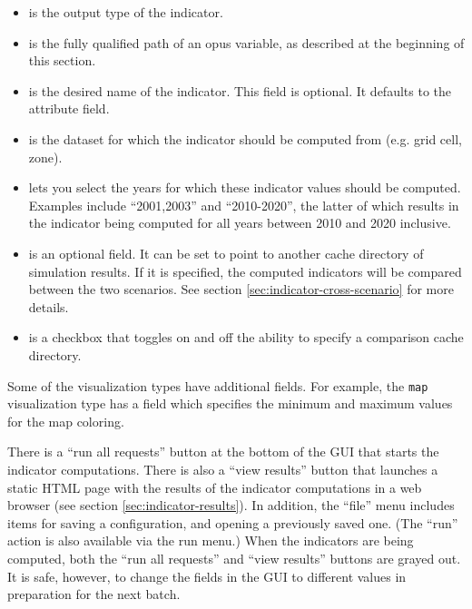 \begin{itemize}
\tight
\item {} is the output type of the indicator.

\item {} is the fully qualified path of an opus variable, as 
described at the beginning of this section. 

\item {} is the desired name of the indicator. This field is optional.
It defaults to the attribute field.

\item {} is the dataset for which the indicator should be 
computed from (e.g. grid cell, zone).

\item {} lets you select the years for
which these indicator values should be computed. Examples include
``2001,2003'' and ``2010-2020'', the latter of which results in 
the indicator being computed for all years between 2010 and 2020
inclusive. 

\item {} is an optional field. It can 
be set to point to another cache directory of simulation results.
If it is specified, the computed indicators will be compared 
between the two scenarios. See section \ref{sec:indicator-cross-scenario} 
for more details. 

\item {} is a checkbox that toggles
on and off the ability to specify a comparison cache directory.

\end{itemize}

Some of the visualization types have additional fields. For example, the
\verb|map| visualization type has a  field which specifies 
the minimum and maximum values for the map coloring. 

There is a ``run all requests'' button at the bottom of the GUI that starts the 
indicator computations.  There is also a ``view results'' button that launches 
a static HTML page with the results of the indicator computations in a web 
browser (see section \ref{sec:indicator-results}). In addition, the ``file'' 
menu includes items for saving a configuration, and opening a previously saved 
one.  (The ``run'' action is also available via the run menu.) When the 
indicators are being computed, both the ``run all requests'' and ``view 
results'' buttons are grayed out. It is safe, however, to change the fields in 
the GUI to different values in preparation for the next batch.



